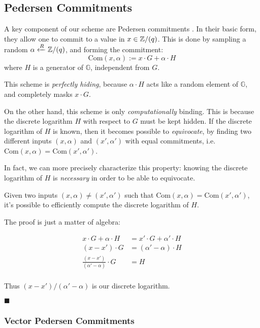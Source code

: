 \subsection{Pedersen Commitments}

A key component of our scheme are Pedersen commitments \cite{pedersen_non-interactive_1992}.
In their basic form, they allow one to commit to a value in $x \in \mathbb{Z}/(q)$. This
is done by sampling a random $\alpha \xleftarrow{R} \mathbb{Z}/(q)$, and forming the commitment:
$$
\text{Com}(x, \alpha) := x \cdot G + \alpha \cdot H
$$
where $H$ is a generator of $\mathbb{G}$, independent from $G$.

This scheme is \emph{perfectly hiding}, because $\alpha \cdot H$ acts like
a random element of $\mathbb{G}$, and completely masks $x \cdot G$.

On the other hand, this scheme is only \emph{computationally} binding. This
is because the discrete logarithm $H$ with respect to $G$ must be kept hidden.
If the discrete logarithm of $H$ is known, then it becomes possible to
\emph{equivocate}, by finding two different inputs $(x, \alpha)$ and $(x', \alpha')$ with
equal commitments, i.e. $\text{Com}(x, \alpha) = \text{Com}(x', \alpha')$.

In fact, we can more precisely characterize this property: knowing
the discrete logarithm of $H$ is \emph{necessary} in order to be able
to equivocate.

\begin{claim}
    \label{claim:ped_dlog}
    Given two inputs $(x, \alpha) \neq (x', \alpha')$ such that ${\text{Com}(x, \alpha) = \text{Com}(x', \alpha')}$,
    it's possible to efficiently compute the discrete logarithm of $H$.
\end{claim}

The proof is just a matter of algebra:

$$
\begin{aligned}
x \cdot G + \alpha \cdot H &= x' \cdot G + \alpha' \cdot H\\
(x - x') \cdot G &= (\alpha' - \alpha) \cdot H\\
\frac{(x - x')}{(\alpha' - \alpha)} \cdot G &= H\\
\end{aligned}
$$

Thus $(x - x') / (\alpha' - \alpha)$ is our discrete logarithm.

$\blacksquare$

\subsubsection{Vector Pedersen Commitments}

